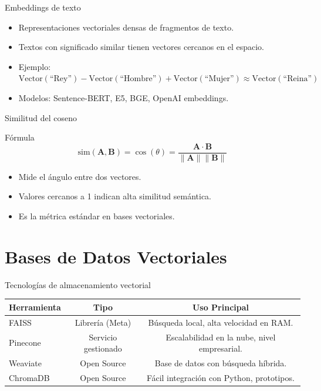 \documentclass[aspectratio=169, 10pt, xcolor=table]{beamer}
\begin{document}
\begin{frame}{Embeddings de texto}
    \begin{itemize}
        \item Representaciones vectoriales densas de fragmentos de texto.
        \item Textos con significado similar tienen vectores cercanos en el espacio.
        \item Ejemplo: $ \text{Vector}(\text{``Rey''}) - \text{Vector}(\text{``Hombre''}) + \text{Vector}(\text{``Mujer''}) \approx \text{Vector}(\text{``Reina''}) $
        \item Modelos: Sentence-BERT, E5, BGE, OpenAI embeddings.
    \end{itemize}
\end{frame}

\begin{frame}{Similitud del coseno}
    \begin{block}{F\'ormula}
        \[
        \text{sim}(\mathbf{A}, \mathbf{B}) = \cos(\theta) = \frac{\mathbf{A} \cdot \mathbf{B}}{\|\mathbf{A}\| \|\mathbf{B}\|}
        \]
        \begin{itemize}
            \item Mide el \'angulo entre dos vectores.
            \item Valores cercanos a 1 indican alta similitud sem\'antica.
            \item Es la m\'etrica est\'andar en bases vectoriales.
        \end{itemize}
    \end{block}
\end{frame}

\section{Bases de Datos Vectoriales}

\begin{frame}{Tecnolog\'ias de almacenamiento vectorial}
    \begin{table}
        \centering
        \begin{tabular}{l|c|c}
            \toprule
            \textbf{Herramienta} & \textbf{Tipo} & \textbf{Uso Principal} \\
            \midrule
            FAISS & Librer\'ia (Meta) & B\'usqueda local, alta velocidad en RAM. \\
            Pinecone & Servicio gestionado & Escalabilidad en la nube, nivel empresarial. \\
            Weaviate & Open Source & Base de datos con b\'usqueda h\'ibrida. \\
            ChromaDB & Open Source & F\'acil integraci\'on con Python, prototipos. \\
            \bottomrule
        \end{tabular}
    \end{table}
\end{frame}
\end{document}
